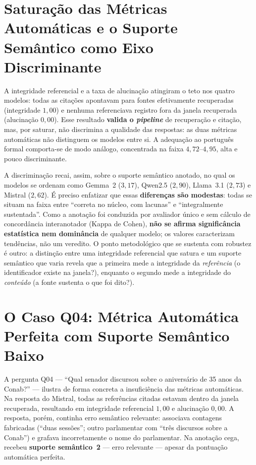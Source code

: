 \section{Saturação das Métricas Automáticas e o Suporte Semântico como Eixo Discriminante}

A integridade referencial e a taxa de alucinação atingiram o teto nos quatro modelos: todas as citações apontavam para fontes efetivamente recuperadas (integridade $1{,}00$) e nenhuma referenciava registro fora da janela recuperada (alucinação $0{,}00$). Esse resultado \textbf{valida o \textit{pipeline}} de recuperação e citação, mas, por saturar, não discrimina a qualidade das respostas: as duas métricas automáticas não distinguem os modelos entre si. A adequação ao português formal comporta-se de modo análogo, concentrada na faixa $4{,}72$--$4{,}95$, alta e pouco discriminante.

A discriminação recai, assim, sobre o suporte semântico anotado, no qual os modelos se ordenam como Gemma~2 ($3{,}17$), Qwen2.5 ($2{,}90$), Llama~3.1 ($2{,}73$) e Mistral ($2{,}62$). É preciso enfatizar que essas \textbf{diferenças são modestas}: todas se situam na faixa entre ``correta no núcleo, com lacunas'' e ``integralmente sustentada''. Como a anotação foi conduzida por avaliador único e sem cálculo de concordância interanotador (Kappa de Cohen), \textbf{não se afirma significância estatística nem dominância} de qualquer modelo; os valores caracterizam tendências, não um veredito. O ponto metodológico que se sustenta com robustez é outro: a distinção entre uma integridade referencial que satura e um suporte semântico que varia revela que a primeira mede a integridade da \textit{referência} (o identificador existe na janela?), enquanto o segundo mede a integridade do \textit{conteúdo} (a fonte sustenta o que foi dito?).

\section{O Caso Q04: Métrica Automática Perfeita com Suporte Semântico Baixo}
\label{sec:res_q04}

A pergunta Q04 --- ``Qual senador discursou sobre o aniversário de 35 anos da Conab?'' --- ilustra de forma concreta a insuficiência das métricas automáticas. Na resposta do Mistral, todas as referências citadas estavam dentro da janela recuperada, resultando em integridade referencial $1{,}00$ e alucinação $0{,}00$. A resposta, porém, continha erro semântico relevante: associava contagens fabricadas (``duas sessões''; outro parlamentar com ``três discursos sobre a Conab'') e grafava incorretamente o nome do parlamentar. Na anotação cega, recebeu \textbf{suporte semântico~2} --- erro relevante --- apesar da pontuação automática perfeita.

